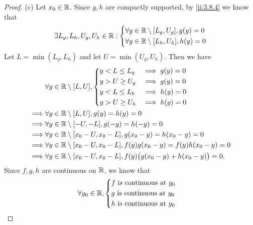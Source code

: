 \begin{proof}{(c)}
  Let \(x_0 \in \mathbb{R}\).
  Since \(g, h\) are compactly supported, by \cref{ii:3.8.4} we know that
  \[
    \exists L_g, L_h, U_g, U_h \in \mathbb{R} : \begin{dcases}
      \forall y \in \mathbb{R} \setminus [L_g, U_g], g(y) = 0 \\
      \forall y \in \mathbb{R} \setminus [L_h, U_h], h(y) = 0
    \end{dcases}
  \]
  Let \(L = \min(L_g, L_h)\) and let \(U = \min(U_g, U_h)\).
  Then we have
  \begin{align*}
             & \forall y \in \mathbb{R} \setminus [L, U], \begin{dcases}
                                                    y < L \leq L_g & \implies g(y) = 0 \\
                                                    y > U \geq U_g & \implies g(y) = 0 \\
                                                    y < L \leq L_h & \implies h(y) = 0 \\
                                                    y > U \geq U_h & \implies h(y) = 0
                                                  \end{dcases}                      \\
    \implies & \forall y \in \mathbb{R} \setminus [L, U], g(y) = h(y) = 0                                         \\
    \implies & \forall y \in \mathbb{R} \setminus [-U, -L], g(-y) = h(-y) = 0                                     \\
    \implies & \forall y \in \mathbb{R} \setminus [x_0 - U, x_0 - L], g(x_0 - y) = h(x_0 - y) = 0                 \\
    \implies & \forall y \in \mathbb{R} \setminus [x_0 - U, x_0 - L], f(y) g(x_0 - y) = f(y) h(x_0 - y) = 0       \\
    \implies & \forall y \in \mathbb{R} \setminus [x_0 - U, x_0 - L], f(y) \big(g(x_0 - y) + h(x_0 - y)\big) = 0.
  \end{align*}
  Since \(f, g, h\) are continuous on \(\mathbb{R}\), we know that
  \begin{align*}
             & \forall y_0 \in \R, \begin{dcases}
                                     f \text{ is continuous at } y_0 \\
                                     g \text{ is continuous at } y_0 \\
                                     h \text{ is continuous at } y_0 \\

\end{dcases}
\end{align*}
\end{proof}
